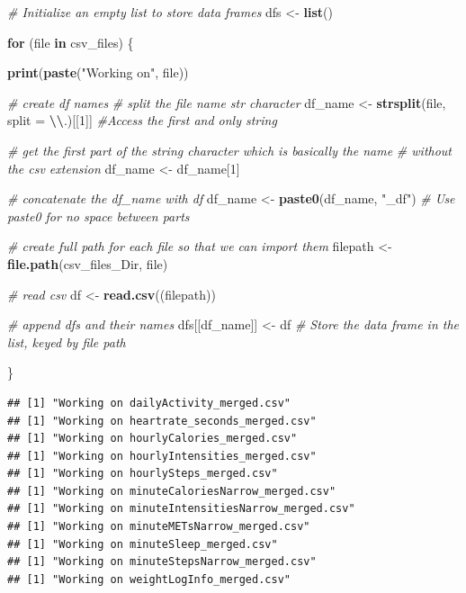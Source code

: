 \documentclass[
]{article}
\newenvironment{Shaded}{\begin{snugshade}}{\end{snugshade}}
\newcommand{\AttributeTok}[1]{\textcolor[rgb]{0.13,0.29,0.53}{#1}}
\newcommand{\CommentTok}[1]{\textcolor[rgb]{0.56,0.35,0.01}{\textit{#1}}}
\newcommand{\ControlFlowTok}[1]{\textcolor[rgb]{0.13,0.29,0.53}{\textbf{#1}}}
\newcommand{\DecValTok}[1]{\textcolor[rgb]{0.00,0.00,0.81}{#1}}
\newcommand{\FunctionTok}[1]{\textcolor[rgb]{0.13,0.29,0.53}{\textbf{#1}}}
\newcommand{\NormalTok}[1]{#1}
\newcommand{\OtherTok}[1]{\textcolor[rgb]{0.56,0.35,0.01}{#1}}
\newcommand{\SpecialCharTok}[1]{\textcolor[rgb]{0.81,0.36,0.00}{\textbf{#1}}}
\newcommand{\StringTok}[1]{\textcolor[rgb]{0.31,0.60,0.02}{#1}}
\begin{document}
\begin{Shaded}
\begin{Highlighting}[]
\CommentTok{\# Initialize an empty list to store data frames}
\NormalTok{dfs }\OtherTok{\textless{}{-}} \FunctionTok{list}\NormalTok{()}


\ControlFlowTok{for}\NormalTok{ (file }\ControlFlowTok{in}\NormalTok{ csv\_files) \{}
  
  \FunctionTok{print}\NormalTok{(}\FunctionTok{paste}\NormalTok{(}\StringTok{"Working on"}\NormalTok{, file))}
  
  \CommentTok{\# create df names}
  \CommentTok{\# split the file name str character}
\NormalTok{  df\_name }\OtherTok{\textless{}{-}} \FunctionTok{strsplit}\NormalTok{(file, }\AttributeTok{split =} \StringTok{\textquotesingle{}}\SpecialCharTok{\textbackslash{}\textbackslash{}}\StringTok{.\textquotesingle{}}\NormalTok{)[[}\DecValTok{1}\NormalTok{]] }\CommentTok{\#Access the first and only string}
  
  \CommentTok{\# get the first part of the string character which is basically the name }
  \CommentTok{\# without the csv extension}
\NormalTok{  df\_name }\OtherTok{\textless{}{-}}\NormalTok{ df\_name[}\DecValTok{1}\NormalTok{]}
  
  \CommentTok{\# concatenate the df\_name with df}
\NormalTok{  df\_name }\OtherTok{\textless{}{-}} \FunctionTok{paste0}\NormalTok{(df\_name, }\StringTok{"\_df"}\NormalTok{) }\CommentTok{\# Use paste0 for no space between parts}
  
  \CommentTok{\# create full path for each file so that we can import them}
\NormalTok{  filepath }\OtherTok{\textless{}{-}} \FunctionTok{file.path}\NormalTok{(csv\_files\_Dir, file)}
  
  \CommentTok{\# read csv }
\NormalTok{  df }\OtherTok{\textless{}{-}} \FunctionTok{read.csv}\NormalTok{((filepath))}
  
  \CommentTok{\# append dfs and their names}
\NormalTok{  dfs[[df\_name]] }\OtherTok{\textless{}{-}}\NormalTok{ df  }\CommentTok{\# Store the data frame in the list, keyed by file path}

\NormalTok{\}}
\end{Highlighting}
\end{Shaded}

\begin{verbatim}
## [1] "Working on dailyActivity_merged.csv"
## [1] "Working on heartrate_seconds_merged.csv"
## [1] "Working on hourlyCalories_merged.csv"
## [1] "Working on hourlyIntensities_merged.csv"
## [1] "Working on hourlySteps_merged.csv"
## [1] "Working on minuteCaloriesNarrow_merged.csv"
## [1] "Working on minuteIntensitiesNarrow_merged.csv"
## [1] "Working on minuteMETsNarrow_merged.csv"
## [1] "Working on minuteSleep_merged.csv"
## [1] "Working on minuteStepsNarrow_merged.csv"
## [1] "Working on weightLogInfo_merged.csv"
\end{verbatim}
\end{document}
